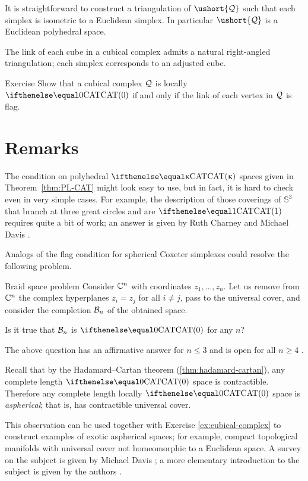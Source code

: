 It is straightforward to construct a triangulation 
of $\ushort{\spc{Q}}$ 
such that each simplex is isometric to a Euclidean simplex.
In particular $\ushort{\spc{Q}}$ is a Euclidean polyhedral space.

The link of each cube in a cubical complex admits a natural right-angled triangulation; 
each simplex corresponds to an adjusted cube.

\begin{thm}{Exercise}\label{ex:cubical-complex}
Show that a cubical complex $\mathcal{Q}$ is locally $\CAT0$ if and only if the link of each vertex in $\mathcal{Q}$ is flag.
\end{thm}

\section{Remarks}

The condition on polyhedral $\CAT\kappa$ spaces given in Theorem~\ref{thm:PL-CAT} might look easy to use, 
but in fact, it is hard to check even in very simple cases.
For example, the description of those coverings of $\mathbb{S}^3$ that branch at three 
great circles and are $\CAT1$ requires quite a bit of work;
an answer is given by Ruth Charney and Michael Davis \cite{charney-davis-1993}.

Analogs of the flag condition for spherical Coxeter simplexes
could resolve the following problem. 

\begin{thm}{Braid space problem}
Consider $\mathbb{C}^n$ with coordinates $z_1,\dots,z_n$.
Let us remove from $\mathbb{C}^n$ the complex hyperplanes $z_i=z_j$ for all $i\ne j$,
pass to the universal cover, and consider the completion $\mathcal{B}_n$ 
of the obtained space.

Is it true that $\mathcal{B}_n$ is $\CAT0$ for any $n$?
\end{thm}

The above question has an affirmative answer for $n\le 3$ and is open for all $n\ge 4$ \cite{charney-davis-1993,panov-petrunin}.

Recall that by the Hadamard--Cartan theorem (\ref{thm:hadamard-cartan}), 
any complete length $\CAT{0}$ space is contractible.
Therefore any complete length locally $\CAT{0}$ space 
is \emph{aspherical};
that is, has contractible universal cover.

This observation can be used together with Exercise \ref{ex:cubical-complex} to construct examples of exotic aspherical spaces;
for example, compact topological manifolds with universal cover not homeomorphic to a Euclidean space.
A survey on the subject is given by Michael Davis \cite{davis-2001}; a more elementary introduction to the subject is given by the authors \cite[Chapter 3]{alexander-kapovitch-petrunin-CAT}.

